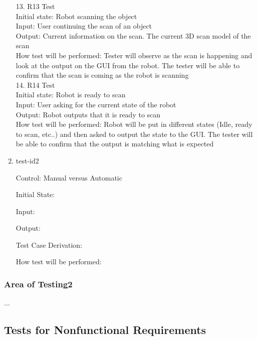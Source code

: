 \documentclass[12pt, titlepage]{article}
\begin{document}
\begin{enumerate}
13.	R13 Test \\
Initial state: Robot scanning the object\\
Input: User continuing the scan of an object \\
Output: Current information on the scan. The current 3D scan model of the scan\\
How test will be performed: Tester will observe as the scan is happening and look at the output on the GUI from the robot. The tester will be able to confirm that the scan is coming as the robot is scanning\\
14.	R14 Test \\
Initial state: Robot is ready to scan\\
Input: User asking for the current state of the robot\\
Output: Robot outputs that it is ready to scan\\
How test will be performed: Robot will be put in different states (Idle, ready to scan, etc..) and then asked to output the state to the GUI. The tester will be able to confirm that the output is matching what is expected \\











\item{test-id2\\}

Control: Manual versus Automatic
					
Initial State: 
					
Input: 
					
Output: 

Test Case Derivation: 

How test will be performed: 

\end{enumerate}

\subsubsection{Area of Testing2}

...

\subsection{Tests for Nonfunctional Requirements}
\end{document}
